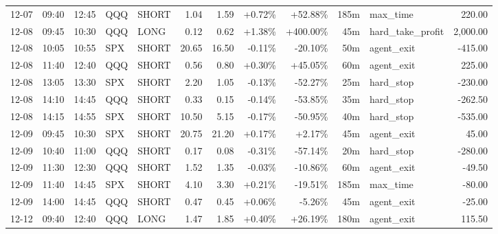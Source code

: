 \documentclass[11pt,a4paper,twoside]{article}
\begin{document}
\begin{center}
\begin{longtable}{>{\color{txtmain}}l l l l l r r r r r >{\color{txtmain}}l r}
12-07 & 09:40 & 12:45 & QQQ & SHORT & 1.04 & 1.59 & \textcolor{wingreen}{+0.72\%} & \textcolor{wingreen}{+52.88\%} & 185m & max\_time & \textcolor{wingreen}{220.00} \\
12-08 & 09:45 & 10:30 & QQQ & LONG & 0.12 & 0.62 & \textcolor{wingreen}{+1.38\%} & \textcolor{wingreen}{+400.00\%} & 45m & hard\_take\_profit & \textcolor{wingreen}{2,000.00} \\
12-08 & 10:05 & 10:55 & SPX & SHORT & 20.65 & 16.50 & \textcolor{lossred}{-0.11\%} & \textcolor{lossred}{-20.10\%} & 50m & agent\_exit & \textcolor{lossred}{-415.00} \\
12-08 & 11:40 & 12:40 & QQQ & SHORT & 0.56 & 0.80 & \textcolor{wingreen}{+0.30\%} & \textcolor{wingreen}{+45.05\%} & 60m & agent\_exit & \textcolor{wingreen}{225.00} \\
12-08 & 13:05 & 13:30 & SPX & SHORT & 2.20 & 1.05 & \textcolor{lossred}{-0.13\%} & \textcolor{lossred}{-52.27\%} & 25m & hard\_stop & \textcolor{lossred}{-230.00} \\
12-08 & 14:10 & 14:45 & QQQ & SHORT & 0.33 & 0.15 & \textcolor{lossred}{-0.14\%} & \textcolor{lossred}{-53.85\%} & 35m & hard\_stop & \textcolor{lossred}{-262.50} \\
12-08 & 14:15 & 14:55 & SPX & SHORT & 10.50 & 5.15 & \textcolor{lossred}{-0.17\%} & \textcolor{lossred}{-50.95\%} & 40m & hard\_stop & \textcolor{lossred}{-535.00} \\
12-09 & 09:45 & 10:30 & SPX & SHORT & 20.75 & 21.20 & \textcolor{wingreen}{+0.17\%} & \textcolor{wingreen}{+2.17\%} & 45m & agent\_exit & \textcolor{wingreen}{45.00} \\
12-09 & 10:40 & 11:00 & QQQ & SHORT & 0.17 & 0.08 & \textcolor{lossred}{-0.31\%} & \textcolor{lossred}{-57.14\%} & 20m & hard\_stop & \textcolor{lossred}{-280.00} \\
12-09 & 11:30 & 12:30 & QQQ & SHORT & 1.52 & 1.35 & \textcolor{lossred}{-0.03\%} & \textcolor{lossred}{-10.86\%} & 60m & agent\_exit & \textcolor{lossred}{-49.50} \\
12-09 & 11:40 & 14:45 & SPX & SHORT & 4.10 & 3.30 & \textcolor{wingreen}{+0.21\%} & \textcolor{lossred}{-19.51\%} & 185m & max\_time & \textcolor{lossred}{-80.00} \\
12-09 & 14:00 & 14:45 & QQQ & SHORT & 0.47 & 0.45 & \textcolor{wingreen}{+0.06\%} & \textcolor{lossred}{-5.26\%} & 45m & agent\_exit & \textcolor{lossred}{-25.00} \\
12-12 & 09:40 & 12:40 & QQQ & LONG & 1.47 & 1.85 & \textcolor{wingreen}{+0.40\%} & \textcolor{wingreen}{+26.19\%} & 180m & agent\_exit & \textcolor{wingreen}{115.50} \\

\end{longtable}
\end{center}
\end{document}
